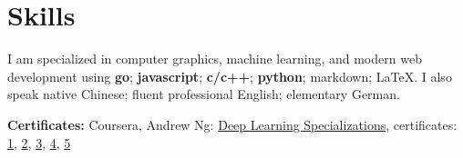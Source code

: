 \section{\textbf{Skills}}
\resumeSubHeadingListStart
\item{
  I am specialized in computer graphics, machine learning, and modern web development using
  \textbf{go}; \textbf{javascript}; \textbf{c/c++}; \textbf{python};
  markdown; \LaTeX. I also speak native Chinese; fluent professional English; elementary German.
}
\item{
  \textbf{Certificates:}{
    Coursera, Andrew Ng: \href{https://www.coursera.org/account/accomplishments/specialization/QGH8ZVJ6J2L2}{Deep Learning Specializations}, certificates:
    \href{https://www.coursera.org/account/accomplishments/verify/YH4NT7HHN263}{1}, 
    \href{https://www.coursera.org/account/accomplishments/verify/QGH3GNGF6BM4}{2}, 
    \href{https://www.coursera.org/account/accomplishments/verify/6VU45R2SZEF6}{3},
    \href{https://www.coursera.org/account/accomplishments/verify/LF3K9BQQDLVL}{4},
    \href{https://www.coursera.org/account/accomplishments/verify/JQFLW2DPYAGW}{5}
  }
}
\resumeSubHeadingListEnd